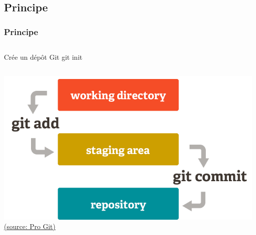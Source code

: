\documentclass[t,11pt]{beamer}
\begin{document}
\subsection{Principe}
\begin{frame}[c]
        \frametitle{Principe}
        \begin{columns}
                \begin{block}{Cr\'ee un d\'ep\^ot Git}
                        \centering
                        git init
                \end{block}
        \end{columns}
        \begin{center}
                \hspace{1.1cm}
                \includegraphics[width=0.5\linewidth]{./img/git_staging_area}
                \newline
                \hspace*{15pt}
                \href{https://git-scm.com/about/staging-area}{{\tiny (source: Pro Git)}}
        \end{center}
\end{frame}
\end{document}
